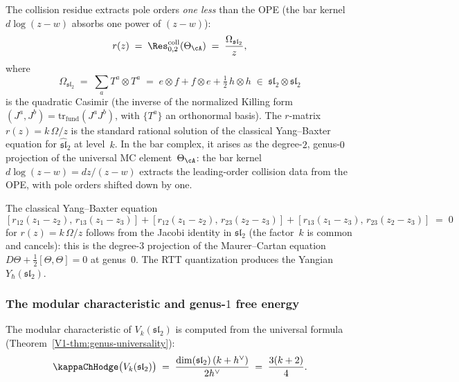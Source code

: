 The collision residue extracts pole orders \emph{one less} than
the OPE (the bar kernel $d\log(z-w)$ absorbs one power of
$(z-w)$):
\begin{equation}\label{eq:benchmark-r-matrix}
 r(z)
 \;=\;
 \Res^{\mathrm{coll}}_{0,2}(\Theta_\cA)
 \;=\;
 \frac{\Omega_{\mathfrak{sl}_2}}{z},
\end{equation}
where
\begin{equation}\label{eq:benchmark-casimir}
 \Omega_{\mathfrak{sl}_2}
 \;=\;
 \sum_a T^a \otimes T^a
 \;=\;
 e \otimes f + f \otimes e
 + \tfrac{1}{2}\, h \otimes h
 \;\in\;
 \mathfrak{sl}_2 \otimes \mathfrak{sl}_2
\end{equation}
is the quadratic Casimir (the inverse of the normalized
Killing form $(J^a, J^b) = \mathrm{tr}_{\mathrm{fund}}(J^a J^b)$,
with $\{T^a\}$ an orthonormal basis).
The $r$-matrix $r(z) = k\,\Omega/z$ is the standard rational
solution of the classical Yang--Baxter equation for
$\widehat{\mathfrak{sl}}_2$ at level~$k$. In the bar complex, it arises as the
degree-$2$, genus-$0$ projection of the universal MC
element~$\Theta_\cA$: the bar kernel $d\log(z-w) = dz/(z-w)$
extracts the leading-order collision data from the OPE, with
pole orders shifted down by one.

The classical Yang--Baxter equation
\begin{equation}\label{eq:benchmark-cybe}
 [r_{12}(z_1 - z_2),\, r_{13}(z_1 - z_3)]
 +
 [r_{12}(z_1 - z_2),\, r_{23}(z_2 - z_3)]
 +
 [r_{13}(z_1 - z_3),\, r_{23}(z_2 - z_3)]
 \;=\; 0
\end{equation}
for $r(z) = k\,\Omega/z$ follows from the Jacobi identity
in $\mathfrak{sl}_2$ (the factor~$k$ is common and cancels): this is the degree-$3$ projection of the
Maurer--Cartan equation $D\Theta + \tfrac{1}{2}[\Theta,\Theta] = 0$
at genus~$0$. The RTT quantization produces the Yangian
$Y_\hbar(\mathfrak{sl}_2)$.


\subsubsection{The modular characteristic and genus-$1$ free energy}
\label{subsubsec:benchmark-modular-characteristic}

The modular characteristic of $V_k(\mathfrak{sl}_2)$ is
computed from the universal formula
(Theorem~\ref*{V1-thm:genus-universality}):
\begin{equation}\label{eq:benchmark-kappa}
 \kappaChHodge\bigl(V_k(\mathfrak{sl}_2)\bigr)
 \;=\;
 \frac{\dim(\mathfrak{sl}_2)\,(k + h^\vee)}{2h^\vee}
 \;=\;
 \frac{3(k + 2)}{4}.
\end{equation}

